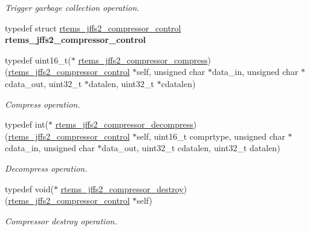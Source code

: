 \begin{DoxyCompactItemize}
\begin{DoxyCompactList}\small\item\em Trigger garbage collection operation. \end{DoxyCompactList}\item 
\mbox{\label{group__JFFS2_gaee4d247481fdc7a3f1b457be80c5e792}} 
typedef struct \mbox{\hyperlink{structrtems__jffs2__compressor__control}{rtems\+\_\+jffs2\+\_\+compressor\+\_\+control}} {\bfseries rtems\+\_\+jffs2\+\_\+compressor\+\_\+control}
\item 
typedef uint16\+\_\+t($\ast$ \mbox{\hyperlink{group__JFFS2_ga38bf7fa8284a6ebf3db7df30916b266f}{rtems\+\_\+jffs2\+\_\+compressor\+\_\+compress}}) (\mbox{\hyperlink{structrtems__jffs2__compressor__control}{rtems\+\_\+jffs2\+\_\+compressor\+\_\+control}} $\ast$self, unsigned char $\ast$data\+\_\+in, unsigned char $\ast$cdata\+\_\+out, uint32\+\_\+t $\ast$datalen, uint32\+\_\+t $\ast$cdatalen)
\begin{DoxyCompactList}\small\item\em Compress operation. \end{DoxyCompactList}\item 
typedef int($\ast$ \mbox{\hyperlink{group__JFFS2_gac59895fce451303d0b8c0851acbfa353}{rtems\+\_\+jffs2\+\_\+compressor\+\_\+decompress}}) (\mbox{\hyperlink{structrtems__jffs2__compressor__control}{rtems\+\_\+jffs2\+\_\+compressor\+\_\+control}} $\ast$self, uint16\+\_\+t comprtype, unsigned char $\ast$cdata\+\_\+in, unsigned char $\ast$data\+\_\+out, uint32\+\_\+t cdatalen, uint32\+\_\+t datalen)
\begin{DoxyCompactList}\small\item\em Decompress operation. \end{DoxyCompactList}\item 
typedef void($\ast$ \mbox{\hyperlink{group__JFFS2_ga728f7d3454f5621b992c0c40447ae0a3}{rtems\+\_\+jffs2\+\_\+compressor\+\_\+destroy}}) (\mbox{\hyperlink{structrtems__jffs2__compressor__control}{rtems\+\_\+jffs2\+\_\+compressor\+\_\+control}} $\ast$self)
\begin{DoxyCompactList}\small\item\em Compressor destroy operation. \end{DoxyCompactList}\end{DoxyCompactItemize}

